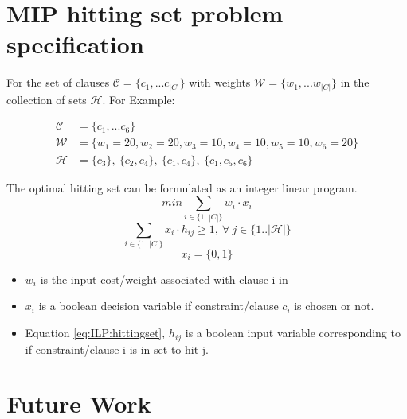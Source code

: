 \documentclass{article}
\newcommand\m[1]{\mathcal{#1}}
\begin{document}
\newpage
\section{MIP hitting set problem specification}
For the set of clauses $ \m{C} = \{c_1, ... c_{|C|}\}$ with weights $\m{W} = \{w_1, ... w_{|C|}\}$ in the collection of sets $\m{H}$. For Example:

\begin{equation} \label{mip:example}
  \begin{split}
    \m{C} &= \{c_1, ... c_6 \}  \\
    \m{W} &= \{w_1 = 20, w_2 = 20,  w_3 = 10,  w_4 = 10,  w_5 = 10,  w_6 = 20\} \\
    \m{H} &= \{c_3 \},\ \{c_2, c_4\},\ \{c_1, c_4\},\ \{c_1, c_5, c_6\}
  \end{split}
\end{equation}

The optimal hitting set can be formulated as an integer linear program.
\begin{equation} \label{eq:ILP:objective}
  min \sum_{ i \in \{1..|C|\}} w_i \cdot x_i
\end{equation}
\begin{equation} \label{eq:ILP:hittingset}
  \sum_{i \in \{1..|C|\}} x_i \cdot h_{ij} \geq 1, \  \forall \ j \in \{1..|\m{H}|\}
\end{equation}
\begin{equation} \label{eq:ILP:bool:xi}
  x_i = \{0,1\}
\end{equation}

\begin{itemize}
  \item $w_i$ is the input cost/weight associated with clause i in
  \item $x_i$ is a boolean decision variable if constraint/clause $c_i$ is chosen or not.
  \item Equation \ref{eq:ILP:hittingset}, $h_{ij}$ is a boolean input variable corresponding to if constraint/clause i is in set to hit j.
\end{itemize}

\newpage
\section{Future Work}

\newpage


\end{document}
